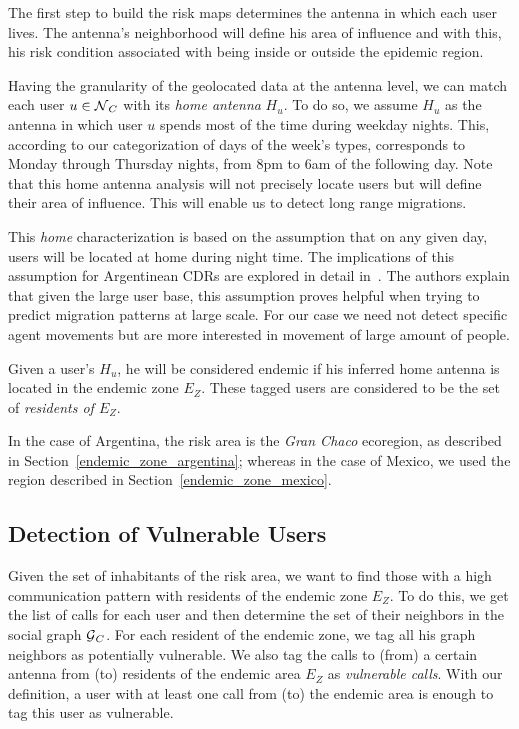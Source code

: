 The first step to build the risk maps determines the antenna in which each user lives. The antenna's neighborhood will define his area of influence and with this, his risk condition associated with being inside or outside the epidemic region.

Having the granularity of the geolocated data at the antenna level, we can match each user $u \in \operatorname{\mathcal{N}}_C$ with its \textit{home antenna} $H_u$. To do so, we assume $H_u$ as the antenna in which user $u$ spends most of the time during weekday nights. This, according to our categorization of days of the week's types, corresponds to Monday through Thursday nights, from 8pm to 6am of the following day. Note that this home antenna analysis will not precisely locate users but will define their area of influence. This will enable us to detect long range migrations.

This \textit{home} characterization is based on the assumption that on any given day, users will be located at home during night time. The implications of this assumption for Argentinean CDRs are explored in detail in~\cite{sarraute2015socialevents,csaji2012exploring}. The authors explain that given the large user base, this assumption proves helpful when trying to predict migration patterns at large scale. For our case we need not detect specific agent movements but are more interested in movement of large amount of people.

Given a user's $H_u$, he will be considered endemic if his inferred home antenna is located in the endemic zone $E_Z$. These tagged users are considered to be the set of \textit{residents of $E_Z$}.

In the case of Argentina, the risk area is the \textit{Gran Chaco} ecoregion, as described in Section~\cref{endemic_zone_argentina};
whereas in the case of Mexico, we used the region described in Section~\cref{endemic_zone_mexico}.


\subsection{Detection of Vulnerable Users}\label{subsection:vulnerable_users_detection}

Given the set of inhabitants of the risk area, we want to find those with a high communication pattern with residents of the endemic zone $E_Z$. To do this, we get the list of calls for each user and then determine the set of their neighbors in the social graph $\operatorname{\mathcal{G}}_C$. For each resident of the endemic zone, we tag all his graph neighbors as potentially vulnerable. We also tag the calls to (from) a certain antenna from (to) residents of the endemic area $E_Z$ as \textit{vulnerable calls}. With our definition, a user with at least one call from (to) the endemic area is enough to tag this user as vulnerable.

